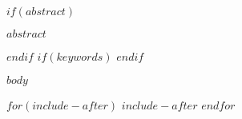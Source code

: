 \documentclass{ICLSarticle} %
\author{$for(author)$$author.name$, $if(author.institution)$$author.institution$, $endif$$author.email$$sep$ \and $endfor$
%
%
\vspace{-10ex}} %
\begin{document}
\maketitle
$if(abstract)$
\begin{ICLSabstract}
$abstract$
\end{ICLSabstract}
$endif$
$if(keywords)$
$endif$

$body$

%


$for(include-after)$
$include-after$
$endfor$
\end{document}
